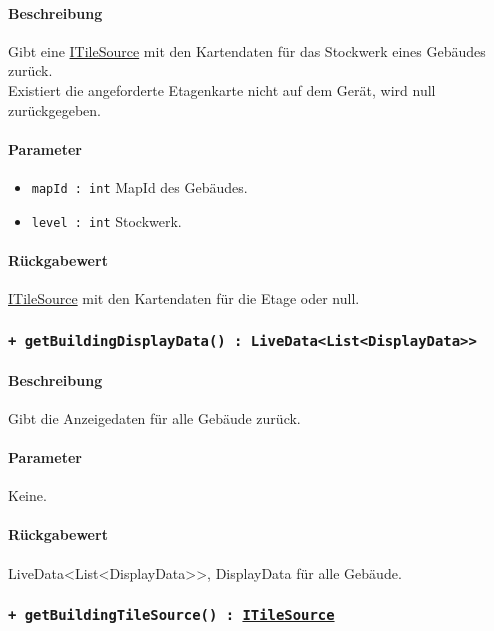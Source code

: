 \paragraph*{Beschreibung}
Gibt eine \href{https://osmdroid.github.io/osmdroid/javadocAll/org/osmdroid/tileprovider/tilesource/ITileSource.html}
{ITileSource} mit den Kartendaten für das Stockwerk eines Gebäudes zurück.\\
Existiert die angeforderte Etagenkarte nicht auf dem Gerät, wird null zurückgegeben.
\paragraph*{Parameter}
\begin{itemize}
    \item \texttt{mapId : int} MapId des Gebäudes.
    \item \texttt{level : int} Stockwerk.
\end{itemize}
\paragraph*{Rückgabewert}
\href{https://osmdroid.github.io/osmdroid/javadocAll/org/osmdroid/tileprovider/tilesource/ITileSource.html}
{ITileSource} mit den Kartendaten für die Etage oder null.

\subsubsection*{\texttt{+ getBuildingDisplayData() : LiveData<List<DisplayData>>}}%
\paragraph*{Beschreibung}
Gibt die Anzeigedaten für alle Gebäude zurück.
\paragraph*{Parameter}
Keine.
\paragraph*{Rückgabewert}
LiveData<List<DisplayData>>, DisplayData für alle Gebäude.

\subsubsection*{\texttt{+ getBuildingTileSource() : \href{https://osmdroid.github.io/osmdroid/javadocAll/org/osmdroid/tileprovider/tilesource/ITileSource.html}
{ITileSource}}}%
